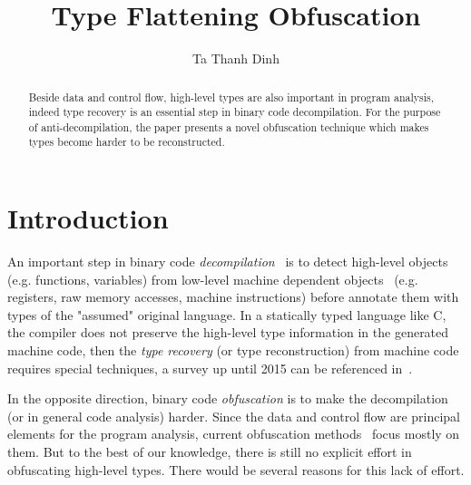 \documentclass[a4paper]{llncs}
\begin{document}
%
\title{Type Flattening Obfuscation}
%
%
\author{Ta Thanh Dinh}
%
%
%
\maketitle              %
%
\begin{abstract}
	Beside data and control flow, high-level types are also important in program analysis,
	indeed type recovery is an essential step in binary code decompilation.
	For the purpose of anti-decompilation, the paper presents a novel obfuscation
	technique which makes types become harder to be reconstructed.



\end{abstract}
%
%
%
\section{Introduction}
An important step in binary code \emph{decompilation}~\cite{cifuentes_reverse_1994} is to
detect high-level objects (e.g. functions, variables) from low-level machine dependent
objects~\cite{balakrishnan_divine_2007} (e.g. registers, raw memory accesses, machine
instructions) before annotate them with types of the "assumed" original language.
In a statically typed language like C, the compiler does not preserve the high-level
type information in the generated machine code,
then the \emph{type recovery} (or type reconstruction) from machine code requires
special techniques, a survey up until 2015 can be referenced in~\cite{caballero_type_2016}.

In the opposite direction, binary code \emph{obfuscation} is to make the decompilation (or in
general code analysis) harder. Since the data and control flow are principal elements for the
program analysis, current obfuscation methods~\cite{collberg_surreptitious_2009} focus mostly
on them. But to the best of our knowledge, there is still no explicit effort in obfuscating
high-level types. There would be several reasons for this lack of effort.
\end{document}

